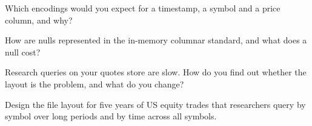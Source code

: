 \begin{interviewq}\label{iq:pl:columnar-formats:3}
Which encodings would you expect for a timestamp, a symbol and a price column, and why?
\end{interviewq}

\begin{interviewq}\label{iq:pl:columnar-formats:4}
How are nulls represented in the in-memory columnar standard, and what does a null cost?
\end{interviewq}

\begin{interviewq}\label{iq:pl:columnar-formats:5}
Research queries on your quotes store are slow. How do you find out whether the layout is the problem, and what do you change?
\end{interviewq}

\begin{interviewq}\label{iq:pl:columnar-formats:6}
Design the file layout for five years of US equity trades that researchers query by symbol over long periods and by time across
all symbols.
\end{interviewq}
